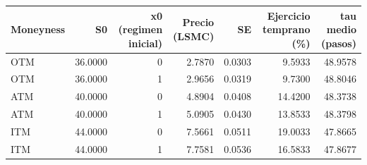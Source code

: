 \begin{tabular}{lrrrrrr}
\toprule
Moneyness & S0 & x0 (regimen inicial) & Precio (LSMC) & SE & Ejercicio temprano (\%) & tau medio (pasos) \\
\midrule
OTM & 36.0000 & 0 & 2.7870 & 0.0303 & 9.5933 & 48.9578 \\
OTM & 36.0000 & 1 & 2.9656 & 0.0319 & 9.7300 & 48.8046 \\
ATM & 40.0000 & 0 & 4.8904 & 0.0408 & 14.4200 & 48.3738 \\
ATM & 40.0000 & 1 & 5.0905 & 0.0430 & 13.8533 & 48.3798 \\
ITM & 44.0000 & 0 & 7.5661 & 0.0511 & 19.0033 & 47.8665 \\
ITM & 44.0000 & 1 & 7.7581 & 0.0536 & 16.5833 & 47.8677 \\
\bottomrule
\end{tabular}
